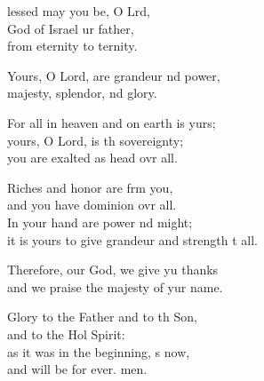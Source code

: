 \begin{psalmverse}
  \begin{patverse}
    lessed may you be, O Lrd,\Flex\\
God of Israel ur father,\Med\\
from eternity to ternity.

Yours, O Lord, are grandeur nd power,\Med\\
majesty, splendor, nd glory.

For all in heaven and on earth is yurs;\Flex\\
yours, O Lord, is th sovereignty;\Med\\
you are exalted as head ovr all.

Riches and honor are frm you,\Med\\
and you have dominion ovr all.\\
In your hand are power nd might;\Med\\
it is yours to give grandeur and strength t all.

Therefore, our God, we give yu thanks\Med\\
and we praise the majesty of yur name.

Glory to the Father and to th Son,\Med\\
    and to the Hol Spirit:\\
as it was in the beginning, \pointup{\i}s now,\Med\\
    and will be for ever. men.
  \end{patverse}
\end{psalmverse}
